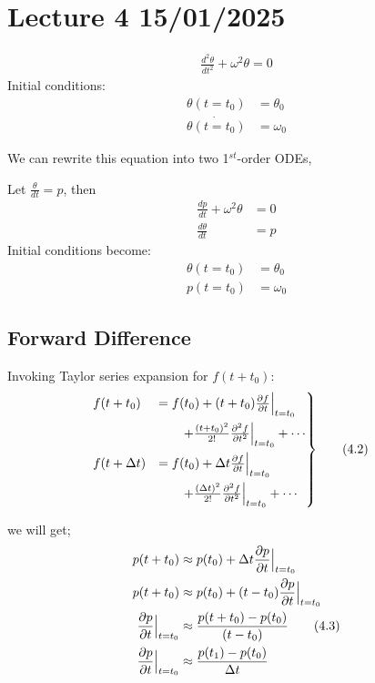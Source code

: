 \documentclass[fleqn,10pt]{SelfArx} %
\begin{document}
\clearpage
\section{Lecture 4 15/01/2025}
\begin{align*}
	\frac{d^2 \theta}{dt^2} + \omega^2\theta = 0 \tag{4.1} \label{simplependulum0}
\end{align*}
Initial conditions:
\begin{align*}
	\theta(t=t_0)       & =\theta_0 \\
	\dot{\theta(t=t_0)} & =\omega_0
\end{align*}

We can rewrite this equation into two 1$^{st}$-order ODEs,

Let $\frac{\theta}{dt}=p$, then
\begin{align}
	\frac{dp}{dt} + \omega^2\theta & = 0 \tag{i}  \label{eq:ic1} \\
	\frac{d\theta}{dt}             & = p \tag{ii} \label{eq:ic2}
\end{align}
Initial conditions become:
\begin{align*}
	\theta(t=t_0) & =\theta_0 \\
	p(t=t_0)      & =\omega_0
\end{align*}

\subsection{Forward Difference}
Invoking Taylor series expansion for $f(t+t_0)$:
\begin{align*}
	\begin{rcases}
		f(t+t_0)      & = f(t_0) + (t+t_0)\frac{\partial f}{\partial t}\Big{|}_{t=t_0}                             \\
		              & \qquad + \frac{(t+t_0)^2}{2!} \frac{\partial^2 f}{\partial t^2}\Big{|}_{t=t_0}	+ \cdots     \\
		f(t+\Delta t) & = f(t_0) + \Delta t \frac{\partial f}{\partial t}\Big{|}_{t=t_0}                           \\
		              & \qquad + \frac{(\Delta t)^2}{2!} \frac{\partial^2 f}{\partial t^2}\Big{|}_{t=t_0} + \cdots
	\end{rcases} & \tag{4.2} \label{eq:taylor-exp-1}
\end{align*}

we will get;
\begin{align*}
	p(t+t_0)                                     & \approx p(t_0) + \Delta t \frac{\partial p}{\partial t}\Big{|}_{t=t_0}       \\
	p(t+t_0)                                     & \approx p(t_0) + (t-t_0) \frac{\partial p}{\partial t}\Big{|}_{t=t_0}        \\
	\frac{\partial p}{\partial t}\Big{|}_{t=t_0} & \approx \frac{p(t+t_0) - p(t_0)}{(t-t_0)} \tag{4.3} \label{eq:forwarddiff_p} \\
	\frac{\partial p}{\partial t}\Big{|}_{t=t_0} & \approx \frac{p(t_1) - p(t_0)}{\Delta t}
\end{align*}
\end{document}
